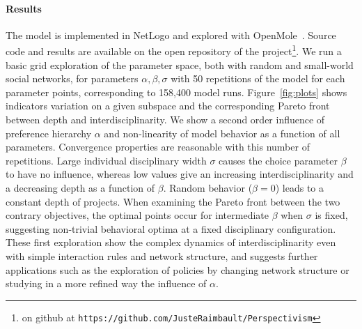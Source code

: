 \paragraph{Results}

The model is implemented in NetLogo and explored with OpenMole~\cite{reuillon2013openmole}. Source code and results are available on the open repository of the project\footnote{on github at \texttt{https://github.com/JusteRaimbault/Perspectivism}}. We run a basic grid exploration of the parameter space, both with random and small-world social networks, for parameters $\alpha,\beta,\sigma$ with 50 repetitions of the model for each parameter points, corresponding to 158,400 model runs. Figure~\ref{fig:plots} shows indicators variation on a given subspace and the corresponding Pareto front between depth and interdisciplinarity. We show a second order influence of preference hierarchy $\alpha$ and non-linearity of model behavior as a function of all parameters. Convergence properties are reasonable with this number of repetitions. Large individual disciplinary width $\sigma$ causes the choice parameter $\beta$ to have no influence, whereas low values give an increasing interdisciplinarity and a decreasing depth as a function of $\beta$. Random behavior ($\beta = 0$) leads to a constant depth of projects. When examining the Pareto front between the two contrary objectives, the optimal points occur for intermediate $\beta$ when $\sigma$ is fixed, suggesting non-trivial behavioral optima at a fixed disciplinary configuration. These first exploration show the complex dynamics of interdisciplinarity even with simple interaction rules and network structure, and suggests further applications such as the exploration of policies by changing network structure or studying in a more refined way the influence of $\alpha$.


